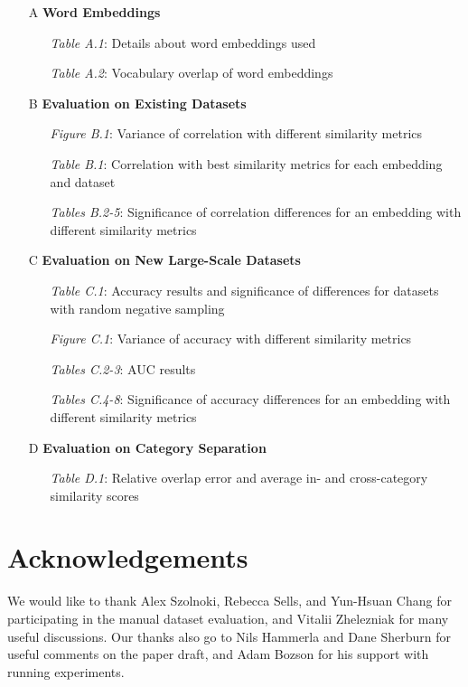 \documentclass[letterpaper]{article} %
\begin{document}
\begin{itemize}
    \item[A] \textbf{Word Embeddings}
    \begin{itemize}
        \item[] \textit{Table A.1}: Details about word embeddings used
        \item[] \textit{Table A.2}: Vocabulary overlap of word embeddings
    \end{itemize}
    \item[B] \textbf{Evaluation on Existing Datasets}
    \begin{itemize}
        \item[] \textit{Figure B.1}: Variance of correlation with different similarity metrics
        \item[] \textit{Table B.1}: Correlation with best similarity metrics for each embedding and dataset
        \item[] \textit{Tables B.2-5}: Significance of correlation differences for an embedding with different similarity metrics
    \end{itemize}
    \item[C] \textbf{Evaluation on New Large-Scale Datasets}
    \begin{itemize}
        \item[] \textit{Table C.1}: Accuracy results and significance of differences for datasets with random negative sampling
        \item[] \textit{Figure C.1}: Variance of accuracy with different similarity metrics
        \item[] \textit{Tables C.2-3}: AUC results
        \item[] \textit{Tables C.4-8}: Significance of accuracy differences for an embedding with different similarity metrics
    \end{itemize}
    \item[D] \textbf{Evaluation on Category Separation}
    \begin{itemize}
        \item[] \textit{Table D.1}: Relative overlap error and average in- and cross-category similarity scores
    \end{itemize}
\end{itemize}

\newpage

\section*{Acknowledgements}
We would like to thank Alex Szolnoki, Rebecca Sells, and Yun-Hsuan Chang for participating in the manual dataset evaluation, and Vitalii Zhelezniak for many useful discussions.
Our thanks also go to Nils Hammerla and Dane Sherburn for useful comments on the paper draft, and Adam Bozson for his support with running experiments.
\end{document}
